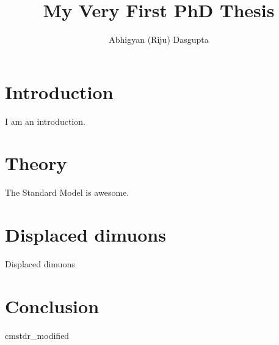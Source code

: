 \documentclass [PhD] {uclathes}
\title          {My Very First PhD Thesis}
\author         {Abhigyan (Riju) Dasgupta}
\begin{document}
\makeintropages


\chapter{Introduction}
I am an introduction.

\chapter{Theory}
The Standard Model is awesome.



\chapter{Displaced dimuons}
Displaced dimuons



\chapter{Conclusion}



 {cmstdr_modified}
\end{document}
